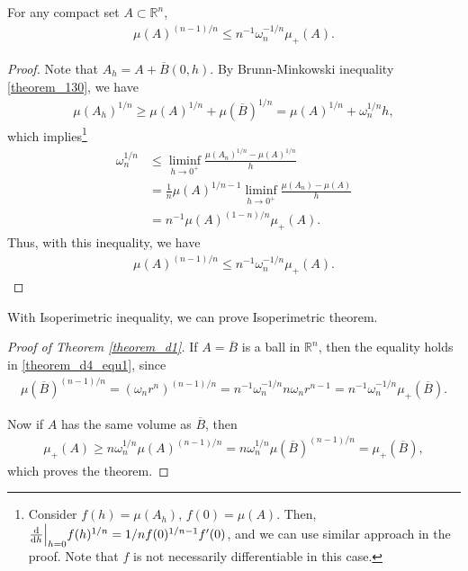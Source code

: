 \begin{theorem}\label{theorem_d4}
For any compact set $A \subset \mathbb{R}^n$,
\begin{align}\label{theorem_d4_equ1}
    \mu(A)^{(n-1)/n} \leq n^{-1} \omega_n^{-1/n} \mu_+(A).
\end{align}
\end{theorem}
\begin{proof}
Note that $A_h = A + \overline{B}(0,h)$. By Brunn-Minkowski inequality \ref{theorem_130}, we have
\begin{align*}
    \mu(A_h)^{1/n} \geq \mu(A)^{1/n} + \mu(\overline{B})^{1/n} = \mu(A)^{1/n} + \omega_n^{1/n}h,
\end{align*}
which implies\footnote{Consider $f(h) = \mu(A_h)$, $f(0) = \mu(A)$. Then, $\dv{}{h}\Big|_{h=0} f(h)^{1/n} = 1/n f(0)^{1/n-1} f'(0)$, and we can use similar approach in the proof. Note that $f$ is not necessarily differentiable in this case.}
\begin{align*}
    \omega_n^{1/n} & \leq \liminf_{h \to 0^+} \frac{\mu(A_n)^{1/n} - \mu(A)^{1/n}}{h} \\
    & = \frac{1}{n} \mu(A)^{1/n-1} \liminf_{h \to 0^+} \frac{\mu(A_n) - \mu(A)}{h} \\
    & = n^{-1} \mu(A)^{(1-n)/n} \mu_+(A).
\end{align*}
Thus, with this inequality, we have
\begin{align*}
    \mu(A)^{(n-1)/n} \leq n^{-1} \omega_n^{-1/n} \mu_+(A).
\end{align*}
\end{proof}

\medskip

With Isoperimetric inequality, we can prove Isoperimetric theorem.

\medskip

\begin{proof}[Proof of Theorem \ref{theorem_d1}]
If $A = \overline{B}$ is a ball in $\mathbb{R}^n$, then the equality holds in \eqref{theorem_d4_equ1}, since
\begin{align*}
    \mu(\overline{B})^{(n-1)/n} = (\omega_n r^n)^{(n-1)/n} = n^{-1} \omega_n^{-1/n} n \omega_n r^{n-1} = n^{-1} \omega_n^{-1/n} \mu_+(\overline{B}).
\end{align*}

Now if $A$ has the same volume as $\overline{B}$, then
\begin{align*}
    \mu_+(A) \geq n \omega_n^{1/n} \mu(A)^{(n-1)/n} = n \omega_n^{1/n} \mu(\overline{B})^{(n-1)/n} = \mu_+(\overline{B}),
\end{align*}
which proves the theorem.
\end{proof}

